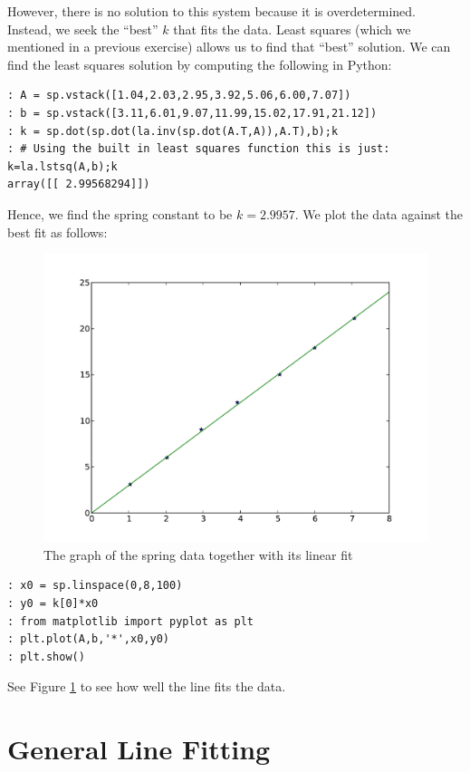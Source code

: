 However, there is no solution to this system because it is overdetermined.  Instead, we seek the ``best'' $k$ that fits the data.  Least squares (which we mentioned in a previous exercise) allows us to find that ``best'' solution. We can find the least squares solution by computing the following in Python:
\begin{lstlisting}[style=python]
: A = sp.vstack([1.04,2.03,2.95,3.92,5.06,6.00,7.07])
: b = sp.vstack([3.11,6.01,9.07,11.99,15.02,17.91,21.12])
: k = sp.dot(sp.dot(la.inv(sp.dot(A.T,A)),A.T),b);k
: # Using the built in least squares function this is just: k=la.lstsq(A,b);k
array([[ 2.99568294]])
\end{lstlisting}
Hence, we find the spring constant to be $k = 2.9957$.  We plot the data against the best fit as follows:
\begin{figure}[h!]
\label{fig1}
\begin{center}
\includegraphics[width=\textwidth]{line_lstsq}
\caption{The graph of the spring data together with its linear fit}
\label{Fig:SpringFit}
\end{center}
\end{figure}

\begin{lstlisting}[style=python]
: x0 = sp.linspace(0,8,100)
: y0 = k[0]*x0
: from matplotlib import pyplot as plt
: plt.plot(A,b,'*',x0,y0)
: plt.show()
\end{lstlisting}
See Figure \ref{Fig:SpringFit} to see how well the line fits the data.


\section*{General Line Fitting}

